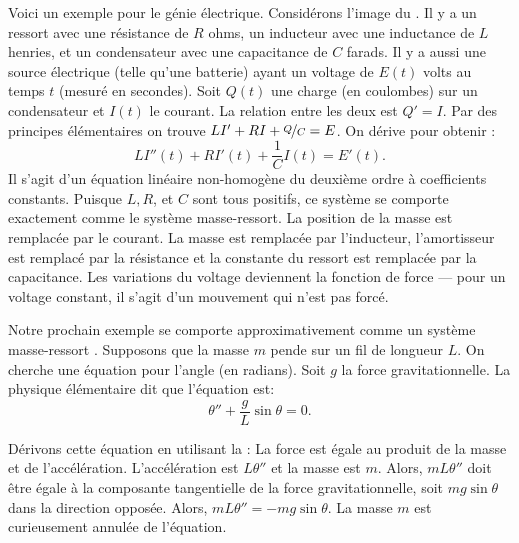 \medskip

\begin{mywrapfigsimp}[5]{1.35in}{1.65in}
\noindent
{}
\end{mywrapfigsimp}
Voici un exemple pour le génie électrique. Considérons l'image du .
Il y a un ressort avec une résistance de $R$ ohms, un inducteur avec une inductance de $L$ henries,
et un condensateur avec une capacitance de $C$ farads.  Il y a aussi une source électrique (telle qu'une batterie) ayant un voltage de  $E(t)$ volts au temps $t$ (mesuré en secondes).
Soit $Q(t)$ une charge (en coulombes) sur un condensateur et $I(t)$ le courant.  La relation entre les deux est
$Q' = I$.  Par des principes élémentaires on trouve 
$L I' + RI + \nicefrac{Q}{C} = E$.  On dérive pour obtenir :   
\begin{equation*}
	L I''(t) + R I'(t) + \frac{1}{C} I(t) = E'(t) .
\end{equation*}
Il s'agit d'un équation linéaire non-homogène du deuxième ordre à coefficients constants. 
Puisque $L, R$, et $C$ sont tous positifs, ce système se comporte exactement comme le système masse-ressort. La position de la masse est remplacée par le courant. La masse est remplacée par l'inducteur, l'amortisseur est remplacé par la résistance et la constante du ressort est remplacée par la capacitance. Les variations du voltage deviennent la fonction de force --- pour un voltage constant, il s'agit d'un mouvement qui n'est pas forcé. 

\medskip

\begin{mywrapfigsimp}[10]{1.8in}{2.16in}
\noindent
{}
\end{mywrapfigsimp}
Notre prochain exemple se comporte approximativement comme un système masse-ressort .  
Supposons que la masse $m$ pende sur un fil de longueur  $L$.  On cherche une équation pour l'angle (en radians). Soit $g$ la force gravitationnelle. La physique élémentaire dit que l'équation est: 
\begin{equation*}
	\theta'' + \frac{g}{L} \sin \theta = 0 .
\end{equation*}

Dérivons cette équation en utilisant la :
La force est égale au produit de la masse et de l'accélération. L'accélération est
$L \theta''$ et la masse est $m$.  
Alors, $mL\theta''$ doit être égale à la composante tangentielle de la force gravitationnelle, soit 
$m g \sin \theta$ dans la direction opposée.
Alors, $mL\theta'' = -mg \sin \theta$.
La masse $m$ est curieusement  annulée de l'équation. 

